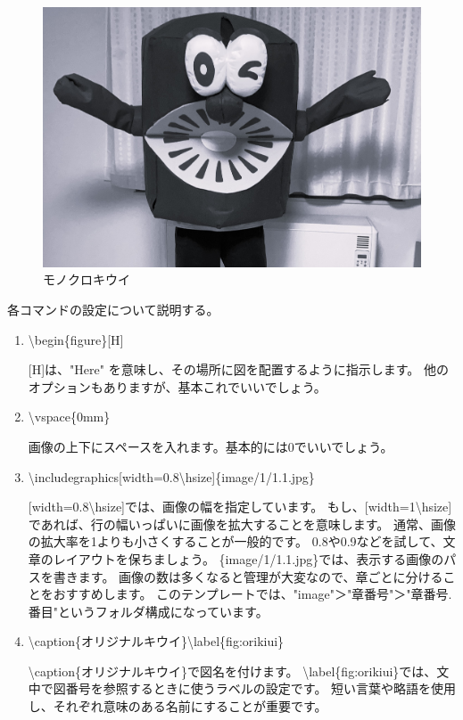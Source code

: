 \begin{figure}[H]
    \vspace{0mm}
    \begin{center}
        \includegraphics[width=0.8\hsize]{image/1/1.2.jpg}
        \caption{モノクロキウイ}\label{fig:monokiui}
    \end{center}
    \vspace{0mm}
\end{figure}

各コマンドの設定について説明する。

\begin{enumerate}
    \item \textbackslash begin\{figure\}[H]
    
        [H]は、"Here" を意味し、その場所に図を配置するように指示します。
        他のオプションもありますが、基本これでいいでしょう。

    \item \textbackslash vspace\{0mm\}
    
        画像の上下にスペースを入れます。基本的には0でいいでしょう。

    \item \textbackslash includegraphics[width=0.8\textbackslash hsize]\{image/1/1.1.jpg\}
    
        [width=0.8\textbackslash hsize]では、画像の幅を指定しています。
        もし、[width=1\textbackslash hsize]であれば、行の幅いっぱいに画像を拡大することを意味します。
        通常、画像の拡大率を1よりも小さくすることが一般的です。
        0.8や0.9などを試して、文章のレイアウトを保ちましょう。
        \{image/1/1.1.jpg\}では、表示する画像のパスを書きます。
        画像の数は多くなると管理が大変なので、章ごとに分けることをおすすめします。
        このテンプレートでは、"image"＞"章番号"＞"章番号.番目"というフォルダ構成になっています。
    
    \item \textbackslash caption\{オリジナルキウイ\}\textbackslash label\{fig:orikiui\}

        \textbackslash caption\{オリジナルキウイ\}で図名を付けます。
        \textbackslash label\{fig:orikiui\}では、文中で図番号を参照するときに使うラベルの設定です。
        短い言葉や略語を使用し、それぞれ意味のある名前にすることが重要です。
    
\end{enumerate}

